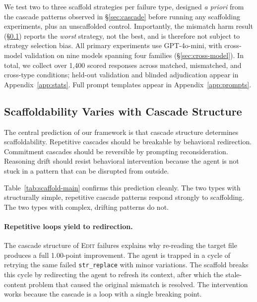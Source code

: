 \documentclass[11pt]{article}
\begin{document}
We test two to three scaffold strategies per failure type, designed \textit{a priori} from the cascade patterns observed in \S\ref{sec:cascade} before running any scaffolding experiments, plus an unscaffolded control.
Importantly, the mismatch harm result (\S\ref{sec:scaffoldability}) reports the \textit{worst} strategy, not the best, and is therefore not subject to strategy selection bias.
All primary experiments use GPT-4o-mini, with cross-model validation on nine models spanning four families (\S\ref{sec:cross-model}).
In total, we collect over 1,400 scored responses across matched, mismatched, and cross-type conditions; held-out validation and blinded adjudication appear in Appendix~\ref{app:stats}.
Full prompt templates appear in Appendix~\ref{app:prompts}.

\subsection{Scaffoldability Varies with Cascade Structure}
\label{sec:scaffoldability}

The central prediction of our framework is that cascade structure determines scaffoldability.
Repetitive cascades should be breakable by behavioral redirection. Commitment cascades should be reversible by prompting reconsideration. Reasoning drift should resist behavioral intervention because the agent is not stuck in a pattern that can be disrupted from outside.

Table~\ref{tab:scaffold-main} confirms this prediction cleanly.
The two types with structurally simple, repetitive cascade patterns respond strongly to scaffolding.
The two types with complex, drifting patterns do not.

\paragraph{Repetitive loops yield to redirection.}
The cascade structure of \textsc{Edit} failures explains why re-reading the target file produces a full 1.00-point improvement.
The agent is trapped in a cycle of retrying the same failed \texttt{str\_replace} with minor variations.
The scaffold breaks this cycle by redirecting the agent to refresh its context, after which the stale-content problem that caused the original mismatch is resolved.
The intervention works because the cascade is a loop with a single breaking point.
\end{document}
